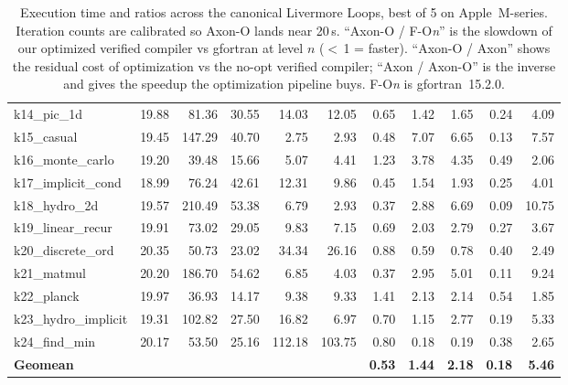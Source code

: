 \begin{table}
\begin{tabular}{@{}l r r r r r r r r r r@{}}
    k14\_pic\_1d               &  19.88 &   81.36 & 30.55 & 14.03 & 12.05 &  0.65 &  1.42 &  1.65 &  0.24 &  4.09 \\
    k15\_casual                &  19.45 &  147.29 & 40.70 &  2.75 &  2.93 &  0.48 &  7.07 &  6.65 &  0.13 &  7.57 \\
    k16\_monte\_carlo          &  19.20 &   39.48 & 15.66 &  5.07 &  4.41 &  1.23 &  3.78 &  4.35 &  0.49 &  2.06 \\
    k17\_implicit\_cond        &  18.99 &   76.24 & 42.61 & 12.31 &  9.86 &  0.45 &  1.54 &  1.93 &  0.25 &  4.01 \\
    k18\_hydro\_2d             &  19.57 &  210.49 & 53.38 &  6.79 &  2.93 &  0.37 &  2.88 &  6.69 &  0.09 & 10.75 \\
    k19\_linear\_recur         &  19.91 &   73.02 & 29.05 &  9.83 &  7.15 &  0.69 &  2.03 &  2.79 &  0.27 &  3.67 \\
    k20\_discrete\_ord         &  20.35 &   50.73 & 23.02 & 34.34 & 26.16 &  0.88 &  0.59 &  0.78 &  0.40 &  2.49 \\
    k21\_matmul                &  20.20 &  186.70 & 54.62 &  6.85 &  4.03 &  0.37 &  2.95 &  5.01 &  0.11 &  9.24 \\
    k22\_planck                &  19.97 &   36.93 & 14.17 &  9.38 &  9.33 &  1.41 &  2.13 &  2.14 &  0.54 &  1.85 \\
    k23\_hydro\_implicit       &  19.31 &  102.82 & 27.50 & 16.82 &  6.97 &  0.70 &  1.15 &  2.77 &  0.19 &  5.33 \\
    k24\_find\_min             &  20.17 &   53.50 & 25.16 & 112.18 & 103.75 &  0.80 &  0.18 &  0.19 &  0.38 &  2.65 \\
    \midrule
    \textbf{Geomean} & & & & & & \textbf{0.53} & \textbf{1.44} & \textbf{2.18} & \textbf{0.18} & \textbf{5.46} \\
    \bottomrule
  \end{tabular}
  \caption{Execution time and ratios across the canonical Livermore Loops,
           best of 5 on Apple~M-series. Iteration counts are calibrated
           so Axon-O lands near 20\,s. ``Axon-O / F-O\textit{n}'' is the slowdown of
           our optimized verified compiler vs gfortran at level $n$ ($<$\,1 = faster).
           ``Axon-O / Axon'' shows the residual cost of optimization vs the no-opt
           verified compiler; ``Axon / Axon-O'' is the inverse and gives the speedup
           the optimization pipeline buys. F-O\textit{n} is gfortran~15.2.0.}
  \label{tab:exec-time-ratios}
\end{table}
